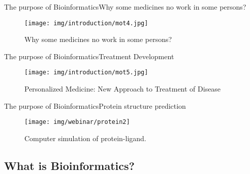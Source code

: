 \documentclass[10pt]{beamer}
\newcommand{\1}{
        	\setbeamertemplate{background}{
        		\texttt{[image: img/1]}
        		\tikz[overlay] \fill[fill opacity=0.75,fill=white] (0,0) rectangle (-\paperwidth,\paperheight);
        	}
}
\begin{document}
\begin{frame}{The purpose of Bioinformatics}{Why some medicines no work in some persons?}
	\begin{figure}[]
		\centering
		\texttt{[image: img/introduction/mot4.jpg]}
		\label{img:mot2}
		\caption{Why some medicines no work in some persons?}
	\end{figure}
\end{frame}

\begin{frame}{The purpose of Bioinformatics}{Treatment Development}
	\begin{figure}[]
		\centering
		\texttt{[image: img/introduction/mot5.jpg]}
		\label{img:mot2}
		\caption{Personalized Medicine: New Approach to Treatment of Disease}
	\end{figure}
\end{frame}

\begin{frame}{The purpose of Bioinformatics}{Protein structure prediction}
	\begin{figure}[]
		\centering
		\texttt{[image: img/webinar/protein2]}
		\label{img:mot2}
		\caption{Computer simulation of protein-ligand.}
	\end{figure}
\end{frame}



\subsection{What is Bioinformatics?}
\end{document}
